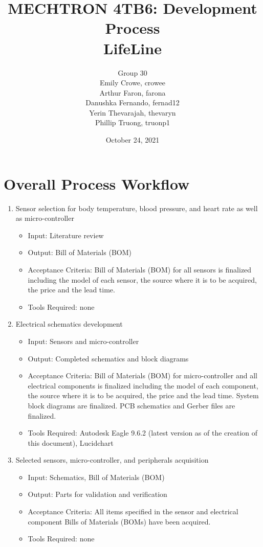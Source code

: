 \documentclass{article}
\title{MECHTRON 4TB6: Development Process \\ LifeLine}
\author{Group 30 \\ Emily Crowe, crowee \\ Arthur Faron, farona \\ Danushka Fernando, fernad12 \\Yerin Thevarajah, thevaryn \\ Phillip Truong, truonp1}
\begin{document}
    \date{October 24, 2021}
	\maketitle
	\newpage
    
	\tableofcontents

	\newpage

	\section{Overall Process Workflow}
    \begin{enumerate}
        \item Sensor selection for body temperature, blood pressure, and heart rate as well as micro-controller
        \begin{itemize}
            \item Input: Literature review
            \item Output: Bill of Materials (BOM)
            \item Acceptance Criteria: Bill of Materials (BOM) for all sensors is finalized including the model of each sensor, the source where it is to be acquired, the price and the lead time.
            \item Tools Required: none 
        \end{itemize}
        
        \item Electrical schematics development
        \begin{itemize}
            \item Input: Sensors and micro-controller
            \item Output: Completed schematics and block diagrams
            \item Acceptance Criteria: Bill of Materials (BOM) for micro-controller and all electrical components is finalized including the model of each component, the source where it is to be acquired, the price and the lead time.  System block diagrams are finalized.  PCB schematics and Gerber files are finalized.
            \item Tools Required: Autodesk Eagle 9.6.2 (latest version as of the creation of this document), Lucidchart
        \end{itemize}
        
        \item Selected sensors, micro-controller, and peripherals acquisition
        \begin{itemize}
            \item Input: Schematics, Bill of Materials (BOM)
            \item Output: Parts for validation and verification
            \item Acceptance Criteria: All items specified in the sensor and electrical component Bills of Materials (BOMs) have been acquired. 
            \item Tools Required: none
        \end{itemize}
        

\end{enumerate}
\end{document}
